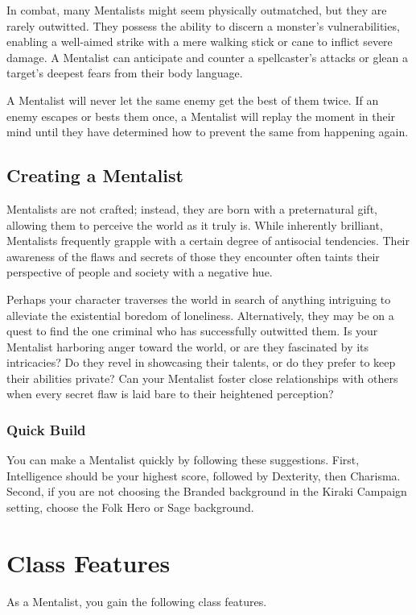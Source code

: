 In combat, many Mentalists might seem physically outmatched, but they are rarely outwitted. They possess the ability to discern a monster's vulnerabilities, enabling a well-aimed strike with a mere walking stick or cane to inflict severe damage. A Mentalist can anticipate and counter a spellcaster's attacks or glean a target's deepest fears from their body language.

A Mentalist will never let the same enemy get the best of them twice. If an enemy escapes or bests them once, a Mentalist will replay the moment in their mind until they have determined how to prevent the same from happening again.

\subsection{Creating a Mentalist}

Mentalists are not crafted; instead, they are born with a preternatural gift, allowing them to perceive the world as it truly is. While inherently brilliant, Mentalists frequently grapple with a certain degree of antisocial tendencies. Their awareness of the flaws and secrets of those they encounter often taints their perspective of people and society with a negative hue.

Perhaps your character traverses the world in search of anything intriguing to alleviate the existential boredom of loneliness. Alternatively, they may be on a quest to find the one criminal who has successfully outwitted them. Is your Mentalist harboring anger toward the world, or are they fascinated by its intricacies? Do they revel in showcasing their talents, or do they prefer to keep their abilities private? Can your Mentalist foster close relationships with others when every secret flaw is laid bare to their heightened perception?

 \subsubsection{Quick Build}
 You can make a Mentalist quickly by following these suggestions. First, Intelligence should be your highest score, followed by Dexterity, then Charisma. Second, if you are not choosing the Branded background in the Kiraki Campaign setting, choose the Folk Hero or Sage background.
 \section{Class Features}
 As a Mentalist, you gain the following class features.
